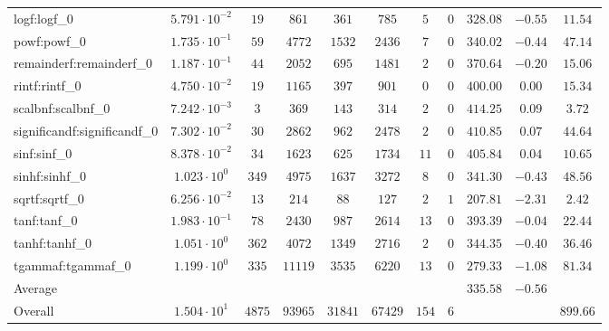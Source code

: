 \begin{tabular}{|l|c|c|c|c|c|c|c|c|c|c|}
logf:logf\_0                 & $ 5.791 \cdot 10^{-2} $ & $ 19     $ & $ 861   $ & $ 361   $ & $ 785   $ & $ 5   $ & $ 0 $ & $ 328.08      $ & $ -0.55   $ & $ 11.54   $ \\
powf:powf\_0                 & $ 1.735 \cdot 10^{-1} $ & $ 59     $ & $ 4772  $ & $ 1532  $ & $ 2436  $ & $ 7   $ & $ 0 $ & $ 340.02      $ & $ -0.44   $ & $ 47.14   $ \\
remainderf:remainderf\_0     & $ 1.187 \cdot 10^{-1} $ & $ 44     $ & $ 2052  $ & $ 695   $ & $ 1481  $ & $ 2   $ & $ 0 $ & $ 370.64      $ & $ -0.20   $ & $ 15.06   $ \\
rintf:rintf\_0               & $ 4.750 \cdot 10^{-2} $ & $ 19     $ & $ 1165  $ & $ 397   $ & $ 901   $ & $ 0   $ & $ 0 $ & $ 400.00      $ & $ 0.00    $ & $ 15.34   $ \\
scalbnf:scalbnf\_0           & $ 7.242 \cdot 10^{-3} $ & $ 3      $ & $ 369   $ & $ 143   $ & $ 314   $ & $ 2   $ & $ 0 $ & $ 414.25      $ & $ 0.09    $ & $ 3.72    $ \\
significandf:significandf\_0 & $ 7.302 \cdot 10^{-2} $ & $ 30     $ & $ 2862  $ & $ 962   $ & $ 2478  $ & $ 2   $ & $ 0 $ & $ 410.85      $ & $ 0.07    $ & $ 44.64   $ \\
sinf:sinf\_0                 & $ 8.378 \cdot 10^{-2} $ & $ 34     $ & $ 1623  $ & $ 625   $ & $ 1734  $ & $ 11  $ & $ 0 $ & $ 405.84      $ & $ 0.04    $ & $ 10.65   $ \\
sinhf:sinhf\_0               & $ 1.023 \cdot 10^{0}  $ & $ 349    $ & $ 4975  $ & $ 1637  $ & $ 3272  $ & $ 8   $ & $ 0 $ & $ 341.30      $ & $ -0.43   $ & $ 48.56   $ \\
sqrtf:sqrtf\_0               & $ 6.256 \cdot 10^{-2} $ & $ 13     $ & $ 214   $ & $ 88    $ & $ 127   $ & $ 2   $ & $ 1 $ & $ 207.81      $ & $ -2.31   $ & $ 2.42    $ \\
tanf:tanf\_0                 & $ 1.983 \cdot 10^{-1} $ & $ 78     $ & $ 2430  $ & $ 987   $ & $ 2614  $ & $ 13  $ & $ 0 $ & $ 393.39      $ & $ -0.04   $ & $ 22.44   $ \\
tanhf:tanhf\_0               & $ 1.051 \cdot 10^{0}  $ & $ 362    $ & $ 4072  $ & $ 1349  $ & $ 2716  $ & $ 2   $ & $ 0 $ & $ 344.35      $ & $ -0.40   $ & $ 36.46   $ \\
tgammaf:tgammaf\_0           & $ 1.199 \cdot 10^{0}  $ & $ 335    $ & $ 11119 $ & $ 3535  $ & $ 6220  $ & $ 13  $ & $ 0 $ & $ 279.33      $ & $ -1.08   $ & $ 81.34   $ \\
\hline
Average                      & $                     $ & $        $ & $       $ & $       $ & $       $ & $     $ & $   $ & $ 335.58      $ & $ -0.56   $ & $         $ \\
\hline
Overall                      & $ 1.504 \cdot 10^{1}  $ & $ 4875   $ & $ 93965 $ & $ 31841 $ & $ 67429 $ & $ 154 $ & $ 6 $ & $             $ & $         $ & $ 899.66  $ \\
\hline
\end{tabular}
